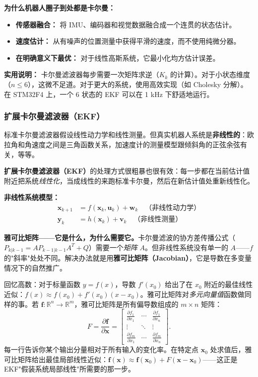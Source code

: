 \textbf{为什么机器人圈子到处都是卡尔曼：}
\begin{itemize}
    \item \textbf{传感器融合：} 将 IMU、编码器和视觉数据融合成一个连贯的状态估计。
    \item \textbf{速度估计：} 从有噪声的位置测量中获得平滑的速度，而不使用纯微分器。
    \item \textbf{在明确意义下最优：} 对于线性高斯系统，它最小化均方估计误差。
\end{itemize}

\textbf{实用说明：} 卡尔曼滤波器每步需要一次矩阵求逆（$K_k$ 的计算）。对于小状态维度（$n \leq 6$），这微不足道。对于更大的系统，使用高效实现（如 Cholesky 分解）。在 STM32F4 上，一个 6 状态的 EKF 可以在 1 kHz 下舒适地运行。

\subsubsection{扩展卡尔曼滤波器（EKF）}

标准卡尔曼滤波器假设线性动力学和线性测量。但真实机器人系统是\textbf{非线性的}：欧拉角和角速度之间是三角函数关系，加速度计的测量模型跟倾斜角的正弦余弦有关，等等。

\textbf{扩展卡尔曼滤波器（EKF）}的处理方式很粗暴也很有效：每一步都在当前估计值附近把系统\textit{线性化}，当成线性的来跑标准卡尔曼，然后在新估计值处重新线性化。

\textbf{非线性系统模型：}
\begin{align}
\mathbf{x}_{k+1} &= f(\mathbf{x}_k, \mathbf{u}_k) + \mathbf{w}_k \quad \text{（非线性动力学）} \\
\mathbf{y}_k &= h(\mathbf{x}_k) + \mathbf{v}_k \quad \text{（非线性测量）}
\end{align}

\textbf{雅可比矩阵——它是什么，为什么需要它。}\;卡尔曼滤波的协方差传播公式（$P_{k|k-1} = A P_{k-1|k-1} A^T + Q$）需要一个\emph{矩阵} $A$。但非线性系统没有单一的 $A$——$f$ 的"斜率"处处不同。解决办法就是用\textbf{雅可比矩阵（Jacobian）}，它是导数在多变量情况下的自然推广。

回忆高数：对于标量函数 $y = f(x)$，导数 $f'(x_0)$ 给出了在 $x_0$ 附近的最佳线性近似：$f(x) \approx f(x_0) + f'(x_0)(x - x_0)$。雅可比矩阵对\emph{多元向量值}函数做同样的事。若 $\mathbf{f}: \mathbb{R}^n \to \mathbb{R}^m$，雅可比矩阵是所有偏导数组成的 $m \times n$ 矩阵：
\[
F = \frac{\partial \mathbf{f}}{\partial \mathbf{x}} = \begin{bmatrix}
\frac{\partial f_1}{\partial x_1} & \cdots & \frac{\partial f_1}{\partial x_n} \\
\vdots & \ddots & \vdots \\
\frac{\partial f_m}{\partial x_1} & \cdots & \frac{\partial f_m}{\partial x_n}
\end{bmatrix}.
\]
每一行告诉你某个输出分量相对于所有输入的变化率。在特定点 $\mathbf{x}_0$ 处求值后，雅可比矩阵给出最佳局部线性近似：$\mathbf{f}(\mathbf{x}) \approx \mathbf{f}(\mathbf{x}_0) + F(\mathbf{x} - \mathbf{x}_0)$——这正是 EKF"假装系统局部线性"所需要的那一步。

